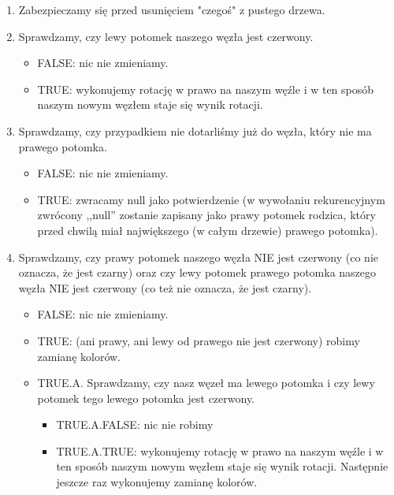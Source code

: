 \documentclass[twoside]{article}
\begin{document}
\begin{enumerate}
    \addtocounter{enumi}{-1}
    \item Zabezpieczamy się przed usunięciem "czegoś" z pustego drzewa.
    \item Sprawdzamy, czy lewy potomek naszego węzła jest czerwony.
        \begin{itemize}
            \item FALSE: nic nie zmieniamy.
            \item TRUE: wykonujemy rotację w prawo na naszym węźle i w ten sposób naszym nowym
                węzłem staje się wynik rotacji.
        \end{itemize}
    \item Sprawdzamy, czy przypadkiem nie dotarliśmy już do węzła, który nie ma prawego potomka.
        \begin{itemize}
            \item FALSE: nic nie zmieniamy.
            \item TRUE: zwracamy null jako potwierdzenie (w wywołaniu rekurencyjnym zwrócony
                ,,null''  zostanie zapisany jako prawy potomek rodzica, który przed chwilą miał
                największego (w całym drzewie) prawego potomka).
        \end{itemize}
    \item Sprawdzamy, czy prawy potomek naszego węzła NIE jest czerwony (co nie oznacza, że jest
        czarny) oraz czy lewy potomek prawego potomka naszego węzła NIE jest czerwony (co też nie
        oznacza, że jest czarny).
        \begin{itemize}
            \item FALSE: nic nie zmieniamy.
            \item TRUE: (ani prawy, ani lewy od prawego nie jest czerwony) robimy zamianę kolorów.
            \item TRUE.A. Sprawdzamy, czy nasz węzeł ma lewego potomka i czy lewy potomek tego
                lewego potomka jest czerwony.
                \begin{itemize}
                    \item TRUE.A.FALSE: nic nie robimy
                    \item TRUE.A.TRUE: wykonujemy rotację w prawo na naszym węźle i w ten sposób
                        naszym nowym węzłem staje się wynik rotacji. Następnie jeszcze raz
                        wykonujemy zamianę kolorów.
                \end{itemize}
        \end{itemize}

\end{enumerate}
\end{document}
